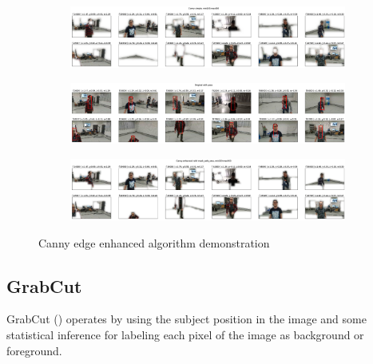 \begin{figure}[!h]
	\begin{center}
		\begin{subfigure}[h]{1\textwidth}
			\centering
			\includegraphics[width=1\textwidth]{"contents/images/04-1canny-enhance-1"}
		\end{subfigure}
		\vfill
		\begin{subfigure}[h]{1\textwidth}
			\centering
			\includegraphics[width=1\textwidth]{"contents/images/04-1canny-enhance-2"}
		\end{subfigure}
		\vfill
		\begin{subfigure}[h]{1\textwidth}
			\centering
			\includegraphics[width=1\textwidth]{"contents/images/04-1canny-enhance-3"}
		\end{subfigure}
	\end{center}
	\vspace{-0.5cm}
	\caption[Canny edge enhanced algorithm demonstration]{Canny edge enhanced algorithm demonstration}
	\label{fig:canny-enanhced}
\end{figure}



\subsection{GrabCut}
\label{subsec:masking-grabcut}

GrabCut (\cite{grabcut2004}) operates by using the subject position in the image and some statistical inference for labeling each pixel of the image as background or foreground. 

